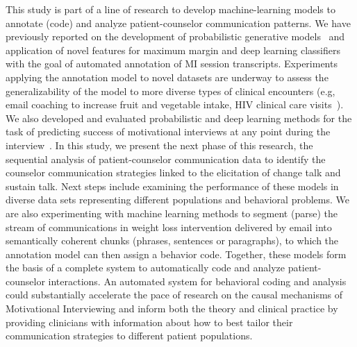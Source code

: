 This study is part of a line of research to develop machine-learning models to annotate (code) and analyze patient-counselor communication patterns. We have previously reported on the development of probabilistic generative models~\cite{kotov2014towards, kotov2015interpretable} and application of novel features for maximum margin and deep learning classifiers~\cite{hasan2016study} with the goal of automated annotation of MI session transcripts. Experiments applying the annotation model to novel datasets are underway to assess the generalizability of the model to more diverse types of clinical encounters (e.g, email coaching to increase fruit and vegetable intake, HIV clinical care visits~\cite{carcone2018using}). We also developed and evaluated probabilistic and deep learning methods for the task of predicting success of motivational interviews at any point during the interview~\cite{hasan2018predicting}. In this study, we present the next phase of this research, the sequential analysis of patient-counselor communication data to identify the counselor communication strategies linked to the elicitation of change talk and sustain talk. Next steps include examining the performance of these models in diverse data sets representing different populations and behavioral problems. We are also experimenting with machine learning methods to segment (parse) the stream of communications in weight loss intervention delivered by email into semantically coherent chunks (phrases, sentences or paragraphs), to which the annotation model can then assign a behavior code. Together, these models form the basis of a complete system to automatically code and analyze patient-counselor interactions. An automated system for behavioral coding and analysis could substantially accelerate the pace of research on the causal mechanisms of Motivational Interviewing and inform both the theory and clinical practice by providing clinicians with information about how to best tailor their communication strategies to different patient populations. 

